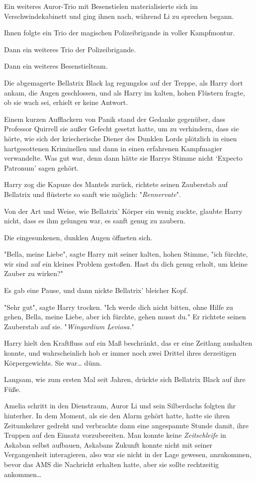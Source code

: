 {Ein weiteres Auror-Trio mit Besenstielen materialisierte sich im Verschwindekabinett und ging ihnen nach, während Li zu sprechen begann.

Ihnen folgte ein Trio der magischen Polizeibrigande in voller Kampfmontur.

Dann ein weiteres Trio der Polizeibrigande.

Dann ein weiteres Besenstielteam.

Die abgemagerte Bellatrix Black lag regungslos auf der Treppe, als Harry dort ankam, die Augen geschlossen, und als Harry im kalten, hohen Flüstern fragte, ob sie wach sei, erhielt er keine Antwort.

Einem kurzen Aufflackern von Panik stand der Gedanke gegenüber, dass Professor Quirrell sie außer Gefecht gesetzt hatte, um zu verhindern, dass sie hörte, wie sich der kriecherische Diener des Dunklen Lords plötzlich in einen hartgesottenen Kriminellen und dann in einen erfahrenen Kampfmagier verwandelte. Was gut war, denn dann hätte sie Harrys Stimme nicht `Expecto Patronum' sagen gehört.

Harry zog die Kapuze des Mantels zurück, richtete seinen Zauberstab auf Bellatrix und flüsterte so sanft wie möglich: "\emph{Rennervate}".

Von der Art und Weise, wie Bellatrix' Körper ein wenig zuckte, glaubte Harry nicht, dass es ihm gelungen war, es sanft genug zu zaubern.

Die eingesunkenen, dunklen Augen öffneten sich.

"Bella, meine Liebe", sagte Harry mit seiner kalten, hohen Stimme, "ich fürchte, wir sind auf ein kleines Problem gestoßen. Hast du dich genug erholt, um kleine Zauber zu wirken?"

Es gab eine Pause, und dann nickte Bellatrix' bleicher Kopf.

"Sehr gut", sagte Harry trocken. "Ich werde dich nicht bitten, ohne Hilfe zu gehen, Bella, meine Liebe, aber ich fürchte, gehen musst du." Er richtete seinen Zauberstab auf sie. "\emph{Wingardium Leviosa.}"

Harry hielt den Kraftfluss auf ein Maß beschränkt, das er eine Zeitlang aushalten konnte, und wahrscheinlich hob er immer noch zwei Drittel ihres derzeitigen Körpergewichts. Sie war… dünn.

Langsam, wie zum ersten Mal seit Jahren, drückte sich Bellatrix Black auf ihre Füße.

Amelia schritt in den Dienstraum, Auror Li und sein Silberdachs folgten ihr hinterher. In dem Moment, als sie den Alarm gehört hatte, hatte sie ihren Zeitumkehrer gedreht und verbrachte dann eine angespannte Stunde damit, ihre Truppen auf den Einsatz vorzubereiten. Man konnte keine \emph{Zeitschleife} in Askaban selbst aufbauen, Askabans Zukunft konnte nicht mit seiner Vergangenheit interagieren, also war sie nicht in der Lage gewesen, anzukommen, bevor das AMS die Nachricht erhalten hatte, aber sie sollte rechtzeitig ankommen…

}
